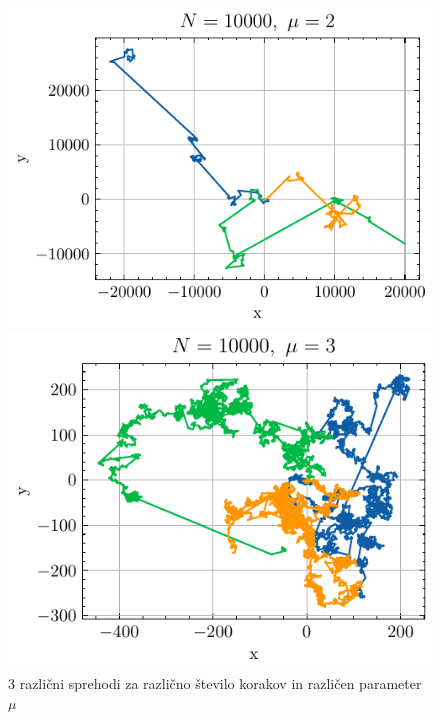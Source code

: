 \documentclass[slovene,11pt,a4paper]{article}
\begin{document}
\begin{figure}[ht]
  \begin{minipage}{0.48\textwidth}
    \centering
    \includegraphics[width=\linewidth]{graphs/N=10000mu=2.pdf}
    
  \end{minipage}%
  \hfill%
  \begin{minipage}{0.48\textwidth}
    \centering
    \includegraphics[width=\linewidth]{graphs/N=10000mu=3.pdf}
    
  \end{minipage}
  \caption{3 različni sprehodi za različno število korakov in različen parameter $\mu$}
  \label{fig: sprehodi}
\end{figure}
\end{document}
